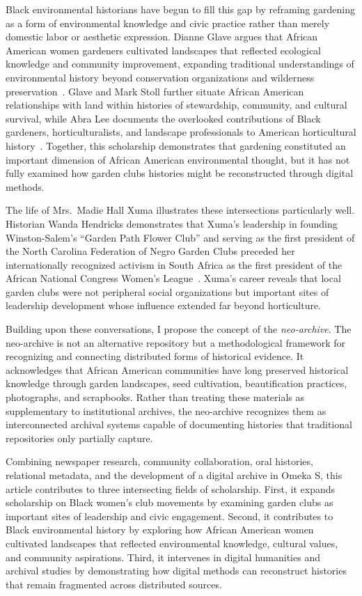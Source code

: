 \documentclass[final]{anthology-ch}
\begin{document}
Black environmental historians have begun to fill this gap by reframing gardening as a form of environmental knowledge and civic practice rather than merely domestic labor or aesthetic expression. Dianne Glave argues that African American women gardeners cultivated landscapes that reflected ecological knowledge and community improvement, expanding traditional understandings of environmental history beyond conservation organizations and wilderness preservation~\cite{glave2003garden}. Glave and Mark Stoll further situate African American relationships with land within histories of stewardship, community, and cultural survival, while Abra Lee documents the overlooked contributions of Black gardeners, horticulturalists, and landscape professionals to American horticultural history~\cite{glave2006love, lee2021conquer}. Together, this scholarship demonstrates that gardening constituted an important dimension of African American environmental thought, but it has not fully examined how garden clubs histories might be reconstructed through digital methods.

The life of Mrs.\ Madie Hall Xuma illustrates these intersections particularly well. Historian Wanda Hendricks demonstrates that Xuma's leadership in founding Winston-Salem's \enquote{Garden Path Flower Club} and serving as the first president of the North Carolina Federation of Negro Garden Clubs preceded her internationally recognized activism in South Africa as the first president of the African National Congress Women's League~\cite{hendricks2022life}. Xuma's career reveals that local garden clubs were not peripheral social organizations but important sites of leadership development whose influence extended far beyond horticulture.

Building upon these conversations, I propose the concept of the \textit{neo-archive}. The neo-archive is not an alternative repository but a methodological framework for recognizing and connecting distributed forms of historical evidence. It acknowledges that African American communities have long preserved historical knowledge through garden landscapes, seed cultivation, beautification practices, photographs, and scrapbooks. Rather than treating these materials as supplementary to institutional archives, the neo-archive recognizes them as interconnected archival systems capable of documenting histories that traditional repositories only partially capture.

Combining newspaper research, community collaboration, oral histories, relational metadata, and the development of a digital archive in Omeka S, this article contributes to three intersecting fields of scholarship. First, it expands scholarship on Black women's club movements by examining garden clubs as important sites of leadership and civic engagement. Second, it contributes to Black environmental history by exploring how African American women cultivated landscapes that reflected environmental knowledge, cultural values, and community aspirations. Third, it intervenes in digital humanities and archival studies by demonstrating how digital methods can reconstruct histories that remain fragmented across distributed sources.
\end{document}
